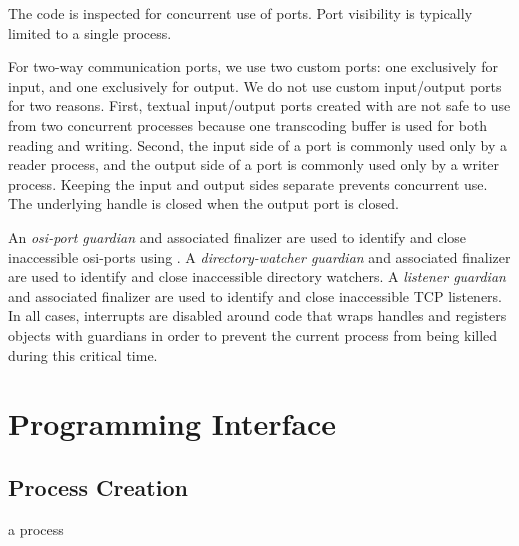   \mitigation The code is
inspected for concurrent use of ports. Port visibility is typically
limited to a single process.

For two-way communication ports, we use two custom ports: one
exclusively for input, and one exclusively for output. We do not use
custom input/output ports for two reasons.  First, textual
input/output ports created with  are not safe
to use from two concurrent processes because one transcoding buffer is
used for both reading and writing.  Second, the input side of a port
is commonly used only by a reader process, and the output side of a
port is commonly used only by a writer process.  Keeping the input and
output sides separate prevents concurrent use. The underlying handle
is closed when the output port is closed.

  \mitigation An
\emph{osi-port guardian} and associated
finalizer are used to identify and close inaccessible osi-ports using
. A \emph{directory-watcher
  guardian} and associated finalizer
are used to identify and close inaccessible directory
watchers.  A \emph{listener
  guardian} and associated finalizer are used
to identify and close inaccessible TCP listeners. In all cases, interrupts are disabled around code that
wraps handles and registers objects with guardians in order to prevent
the current process from being killed during this critical time.

\section {Programming Interface}\label{sec:erlang-api}

\subsection {Process Creation}

\begin{procedure}
\end{procedure}
\returns{} a process


